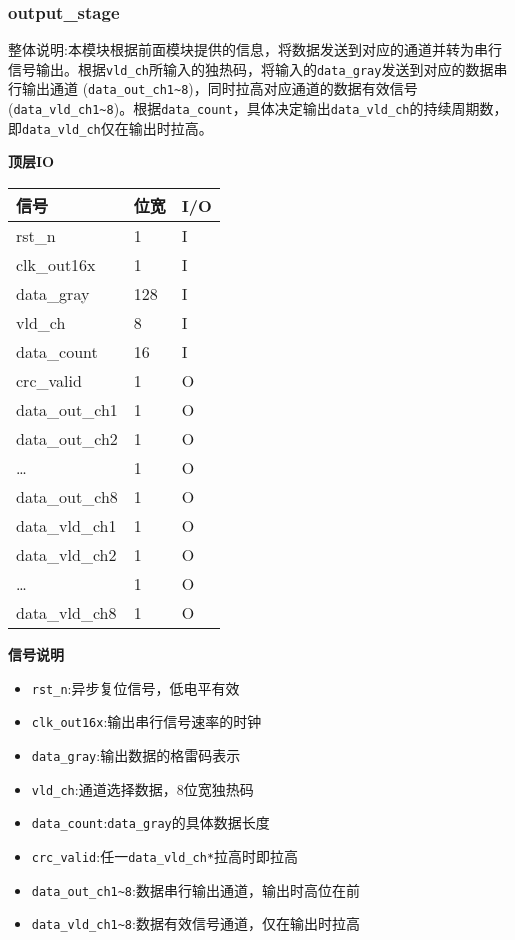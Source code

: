 \documentclass[12pt,]{article}
\providecommand{\tightlist}{%
  \setlength{\itemsep}{0pt}\setlength{\parskip}{0pt}}
\begin{document}
\hypertarget{output_stage}{%
\subsubsection{output\_stage}\label{output_stage}}

整体说明:本模块根据前面模块提供的信息，将数据发送到对应的通道并转为串行信号输出。根据\texttt{vld\_ch}所输入的独热码，将输入的\texttt{data\_gray}发送到对应的数据串行输出通道
(\texttt{data\_out\_ch1\textasciitilde{}8})，同时拉高对应通道的数据有效信号
(\texttt{data\_vld\_ch1\textasciitilde{}8})。根据\texttt{data\_count}，具体决定输出\texttt{data\_vld\_ch}的持续周期数，即\texttt{data\_vld\_ch}仅在输出时拉高。

\textbf{顶层IO}

\begin{longtable}[]{@{}lll@{}}
\toprule\noalign{}
信号 & 位宽 & I/O \\
\midrule\noalign{}
\endhead
\bottomrule\noalign{}
\endlastfoot
rst\_n & 1 & I \\
clk\_out16x & 1 & I \\
data\_gray & 128 & I \\
vld\_ch & 8 & I \\
data\_count & 16 & I \\
crc\_valid & 1 & O \\
data\_out\_ch1 & 1 & O \\
data\_out\_ch2 & 1 & O \\
\ldots{} & 1 & O \\
data\_out\_ch8 & 1 & O \\
data\_vld\_ch1 & 1 & O \\
data\_vld\_ch2 & 1 & O \\
\ldots{} & 1 & O \\
data\_vld\_ch8 & 1 & O \\
\end{longtable}

\textbf{信号说明}

\begin{itemize}
\tightlist
\item
  \texttt{rst\_n}:异步复位信号，低电平有效
\item
  \texttt{clk\_out16x}:输出串行信号速率的时钟
\item
  \texttt{data\_gray}:输出数据的格雷码表示
\item
  \texttt{vld\_ch}:通道选择数据，8位宽独热码
\item
  \texttt{data\_count}:\texttt{data\_gray}的具体数据长度
\item
  \texttt{crc\_valid}:任一\texttt{data\_vld\_ch*}拉高时即拉高
\item
  \texttt{data\_out\_ch1\textasciitilde{}8}:数据串行输出通道，输出时高位在前
\item
  \texttt{data\_vld\_ch1\textasciitilde{}8}:数据有效信号通道，仅在输出时拉高
\end{itemize}
\end{document}
